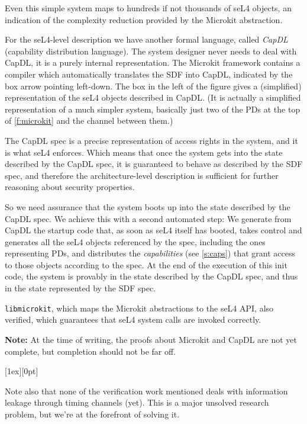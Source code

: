 \documentclass[english,a4paper,12pt]{report}
\newcommand{\code}[1]{\texttt{#1}}
\newlength{\chillilng}\setlength{\chillilng}{8mm}
\newlength{\chillimarg}\setlength{\chillimarg}{10mm}
\newcommand{\chilli}{\texttt{[image: chilli]}}
\newcommand{\chilliItem}{\raisebox{-5mm}[1ex][0pt]{%
      \makebox[\chillilng][r]{\chilli}}}
\newenvironment{Chilli}{
    \begin{list}{}{
      \setlength{\labelwidth}{\chillilng}
      \setlength{\leftmargin}{\chillimarg}}
    \item[\chilliItem]
    }
  {\end{list}}
\begin{document}
  Even this simple system maps to hundreds if not thousands of seL4
  objects, an indication of the complexity reduction provided by the
  Microkit abstraction.

  For the seL4-level description we have another formal language,
  called \emph{CapDL} (capability distribution language). The system designer
  never needs to deal with CapDL, it is a purely internal
  representation. The Microkit framework contains a compiler which
  automatically translates the SDF into CapDL, indicated by the box
  arrow pointing left-down. The box in the left of the figure gives a
  (simplified) representation of the seL4 objects described in
  CapDL. (It is actually a simplified representation of a much simpler
  system, basically just two of the PDs at the top of
  \autoref{f:microkit} and the channel between them.)

  The CapDL spec is a precise representation of access rights in the
  system, and it is what seL4 enforces. Which means that once the
  system gets into the state described by the CapDL spec, it is
  guaranteed to behave as described by the SDF spec, and
  therefore the architecture-level description is sufficient for
  further reasoning about security properties.

  So we need assurance that the system boots up into the state
  described by the CapDL spec. We achieve this with a second
  automated step: We generate from CapDL the startup code that, as
  soon as seL4 itself has booted, takes control and generates all the
  seL4 objects referenced by the spec, including the ones representing
  PDs, and distributes the \emph{capabilities} (see
  \autoref{s:caps}) that grant access to those objects according to
  the spec. At the end of the execution of this init code, the system is
  provably in the state described by the CapDL spec, and thus in the
  state represented by the SDF spec.

  \code{libmicrokit}, which maps the Microkit abstractions to the seL4 API,
  also verified, which guarantees that seL4 system calls are invoked correctly.

  \textbf{Note:} At the time of writing, the proofs about Microkit and
  CapDL are not yet complete, but completion should not be far off.

  \begin{Chilli}
    Note also that none of the verification work mentioned deals with
    information leakage through timing channels (yet). This is a
    major unsolved research problem, but we're at the forefront of
    solving it.
  \end{Chilli}
\end{document}
